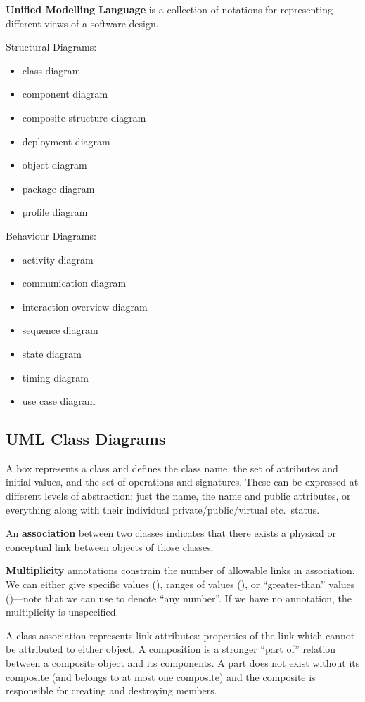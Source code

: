 \documentclass[12pt]{article}
\begin{document}
{\bf Unified Modelling Language} is a collection of notations for representing different views of a software design.

Structural Diagrams:
\begin{itemize}
\item class diagram
\item component diagram
\item composite structure diagram
\item deployment diagram
\item object diagram
\item package diagram
\item profile diagram
\end{itemize}

Behaviour Diagrams:
\begin{itemize}
\item activity diagram
\item communication diagram
\item interaction overview diagram
\item sequence diagram
\item state diagram
\item timing diagram
\item use case diagram
\end{itemize}

\subsection{UML Class Diagrams}
A box represents a class and defines the class name, the set of attributes and initial values, and the set of operations and signatures. These can be expressed at different levels of abstraction: just the name, the name and public attributes, or everything along with their individual private/public/virtual etc.\ status.

An {\bf association} between two classes indicates that there exists a physical or conceptual link between objects of those classes.

{\bf Multiplicity} annotations constrain the number of allowable links in association. We can either give specific values (), ranges of values (), or ``greater-than'' values ()---note that we can use \code{*} to denote ``any number''. If we have no annotation, the multiplicity is unspecified.

A class association represents link attributes: properties of the link which cannot be attributed to either object. A composition is a stronger ``part of'' relation between a composite object and its components. A part does not exist without its composite (and belongs to at most one composite) and the composite is responsible for creating and destroying members.
\end{document}
